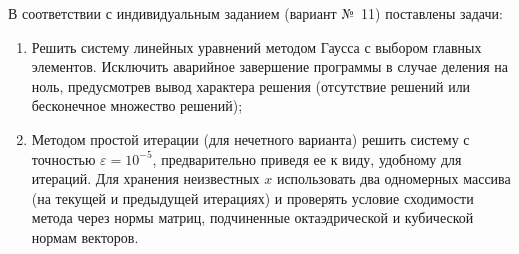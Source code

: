 В соответствии с индивидуальным заданием (вариант №~11) поставлены задачи:
\begin{enumerate}
    \item Решить систему линейных уравнений методом Гаусса с выбором главных элементов. Исключить аварийное завершение программы в случае деления на ноль, предусмотрев вывод характера решения (отсутствие решений или бесконечное множество решений);
    \item Методом простой итерации (для нечетного варианта) решить систему с точностью $\varepsilon = 10^{-5}$, предварительно приведя ее к виду, удобному для итераций. Для хранения неизвестных $x$ использовать два одномерных массива (на текущей и предыдущей итерациях) и проверять условие сходимости метода через нормы матриц, подчиненные октаэдрической и кубической нормам векторов.
\end{enumerate}
